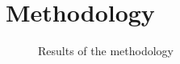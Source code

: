 \chapter{Methodology}
\label{ch:Methodology}







\begin{figure}
    \centering
    \caption{Results of the methodology}
    \label{tab:results}
\end{figure}
